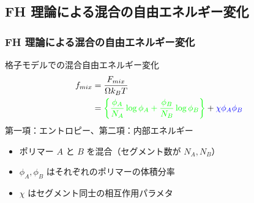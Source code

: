 \documentclass[unicode,12pt]{beamer}%
\begin{document}
\subsection{FH 理論による混合の自由エネルギー変化}
\begin{frame}\frametitle{FH 理論による混合の自由エネルギー変化}
	格子モデルでの混合自由エネルギー変化
	\vspace{-0.5\baselineskip}
	\begin{align*}
	f_{mix} &= \dfrac{F_{mix}}{\Omega k_B T} \notag \\
	&= \color{green}\left\{ \dfrac{\phi_A}{N_A} \log \phi_A 
	+ \dfrac{\phi_B}{N_B} \log \phi_B \right\} \color{black} 
	+ \color{blue}\chi \phi_A \phi_B \color{black}
	\end{align*}
	\color{green}第一項：エントロピー\color{black}、\color{blue}第二項：内部エネルギー\color{black}
	\begin{itemize}
	\item  ポリマー $A$ と $B$ を混合（セグメント数が $N_A, N_B$）
	\item $\phi_A, \phi_B$ はそれぞれのポリマーの体積分率
	\item $\chi$ はセグメント同士の\color{red}相互作用パラメタ\color{black}
	\end{itemize}	
\end{frame}
\end{document}
